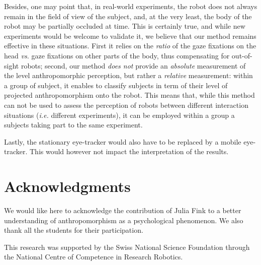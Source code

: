 \documentclass[lettersize, noapacite, twoside, HRI]{apa_HRI}
\newcommand{\ie}{\textit{i.e.}\xspace}
\newcommand{\vs}{\textit{vs.}\xspace}
\begin{document}
Besides, one may point that, in real-world experiments, the robot does not
always remain in the field of view of the subject, and, at the very least, the
body of the robot may be partially occluded at time.  This is certainly true,
and while new experiments would be welcome to validate it, we believe that our
method remains effective in these situations. First it relies on the
\emph{ratio} of the gaze fixations on the head \vs gaze fixations on other parts
of the body, thus compensating for out-of-sight robots; second, our method
\emph{does not} provide an \emph{absolute} measurement of the level
anthropomorphic perception, but rather a \emph{relative} measurement: within a
group of subject, it enables to classify subjects in term of their level of
projected anthropomorphism onto the robot.  This means that, while this method
can not be used to assess the perception of robots between different interaction
situations (\ie different experiments), it can be employed within a group a
subjects taking part to the same experiment.

Lastly, the stationary eye-tracker would also have to be replaced by a mobile
eye-tracker. This would however not impact the interpretation of the results.

\section*{Acknowledgments}

We would like here to acknowledge the contribution of Julia Fink to a better
understanding of anthropomorphism as a psychological phenomenon. We also thank
all the students for their participation.

This research was supported by the Swiss National Science Foundation through the
National Centre of Competence in Research Robotics.





%
%
\end{document}
